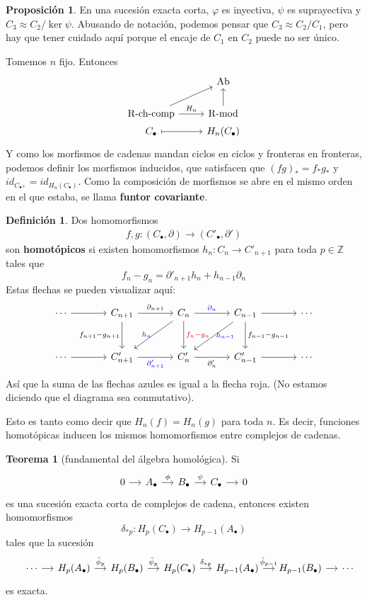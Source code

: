 \documentclass[spanish]{book}
\theoremstyle{definition}
\newtheorem*{defn}{Definición}
\newtheorem*{teo}{Teorema}
\newtheorem*{prop}{Proposición}
\newcommand{\Z}{\mathbb{Z}}
\DeclareMathOperator{\RCH}{R\text{-}ch\text{-}comp}
\DeclareMathOperator{\RMod}{R\text{-}mod}
\DeclareMathOperator{\Ab}{Ab}
\begin{document}
\begin{prop} En una sucesión exacta corta, $\varphi$ es inyectiva, $\psi$ es suprayectiva y $C_3\approx C_2/\ker\psi$. Abusando de notación, podemos pensar que $C_3\approx C_2/C_1$, pero hay que tener cuidado aquí porque el encaje de $C_1$ en $C_2$ puede no ser único.
\end{prop}
Tomemos $n$ fijo. Entonces
\[\begin{tikzcd}
	&\Ab\\
	\RCH \arrow[r,"H_n"]\arrow[ru]&\RMod \arrow[u]\\[-0.6cm]
	C_\bullet\arrow[r,maps to]&H_n(C_\bullet)
\end{tikzcd}\]
Y como los morfismos de cadenas mandan ciclos en ciclos y fronteras en fronteras, podemos definir los morfismos inducidos, que satisfacen que $(fg)_*=f_*g_*$ y $id_{C_{\bullet*}}=id_{H_n(C_\bullet)}$. Como la composición de morfismos se abre en el mismo orden en el que estaba, se llama \textbf{funtor covariante}.
\begin{defn}
	Dos homomorfismos 
	\begin{align*}
		f,g:(C_\bullet,\partial)\to(C'_\bullet,\partial')
	\end{align*}
	son \textbf{homotópicos} si existen homomorfismos $h_n:C_n\to C'_{n+1}$ para toda $p\in\Z$ tales que \[f_n-g_n=\partial'_{n+1}h_n+h_{n-1}\partial_n\] Estas flechas se pueden visualizar aquí:
	\[\begin{tikzcd}[column sep=large, row sep=large]
		\cdots \arrow{r} & C_{n+1} \arrow{r}{\partial_{n+1}} \arrow{d}[left]{f_{n+1}-g_{n+1}} & C_n \arrow{r}[blue]{\partial_n} \arrow{d}[right,red]{f_n-g_n} \arrow{ld}[left,blue]{h_n} & C_{n-1} \arrow{r} \arrow{d}[right]{f_{n-1}-g_{n-1}} \arrow{ld}[right,blue]{h_{n-1}} & \cdots \\
		\cdots \arrow{r} & C'_{n+1} \arrow{r}[below,blue]{\partial'_{n+1}} & C'_n \arrow{r}[below]{\partial_n'} & C'_{n-1} \arrow{r} & \cdots
	\end{tikzcd}
	\]
	Así que la suma de las flechas azules es igual a la flecha roja. (No estamos diciendo que el diagrama sea conmutativo).
	
	Esto es tanto como decir que $H_n(f)=H_n(g)$ para toda $n$. Es decir, funciones homotópicas inducen los mismos homomorfismos entre complejos de cadenas.
\end{defn}
	\begin{teo}[fundamental del álgebra homológica]
	Si 
	\[\begin{tikzcd}[column sep=small]
		0\arrow{r}&A_\bullet\arrow{r}{\phi}&B_\bullet\arrow{r}{\psi}&C_\bullet\arrow{r}&0
	\end{tikzcd}\]
	es una sucesión exacta corta de complejos de cadena, entonces existen homomorfismos \[\delta_{*p}:H_p(C_\bullet)\to H_{p-1}(A_\bullet)\]
	tales que la sucesión
	\[\begin{tikzcd}[column sep=small]
		&\cdots\arrow{r}&H_p(A_\bullet)\arrow{r}{\bar\phi_p}&H_p(B_\bullet)\arrow{r}{\bar\psi_p}&H_p(C_\bullet)\arrow{r}{\delta_{*p}}&H_{p-1}(A_\bullet)\arrow{r}{\bar\phi_{p-1}}&H_{p-1}(B_\bullet)\arrow{r}&\cdots
	\end{tikzcd}\]
	es exacta.
\end{teo}
\end{document}
